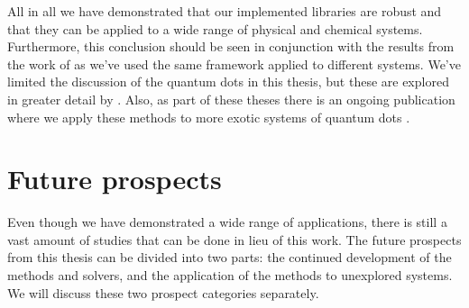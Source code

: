     All in all we have demonstrated that our implemented libraries are robust
    and that they can be applied to a wide range of physical and chemical
    systems.
    Furthermore, this conclusion should be seen in conjunction with the results
    from the work of \citeauthor{greg-winther} \cite{greg-winther} as we've used
    the same framework applied to different systems.
    We've limited the discussion of the quantum dots in this thesis, but these
    are explored in greater detail by \citeauthor{greg-winther}.
    Also, as part of these theses there is an ongoing publication where we apply
    these methods to more exotic systems of quantum dots \cite{td-quantum-dots}.


    \section{Future prospects}
        \label{sec:future-work}
        Even though we have demonstrated a wide range of applications, there is
        still a vast amount of studies that can be done in lieu of this work.
        The future prospects from this thesis can be divided into two parts: the
        continued development of the methods and solvers, and the application of
        the methods to unexplored systems.
        We will discuss these two prospect categories separately.


